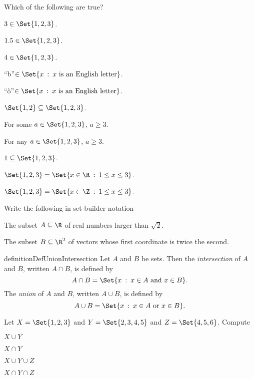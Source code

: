 \begin{question}
	Which of the following are true?
	\begin{parts}
		\item $3\in\Set{1,2,3}$.
		\item $1.5\in\Set{1,2,3}$.
		\item $4\in\Set{1,2,3}$.
		\item ``b''$\in\Set{x\given x\text{ is an English letter}}$.
		\item ``\`o''$\in\Set{x\given x\text{ is an English letter}}$.
		\item $\Set{1,2}\subseteq \Set{1,2,3}$.
		\item For some $a\in\Set{1,2,3}$, $a \geq 3$.
		\item For any $a\in\Set{1,2,3}$, $a\geq 3$.
		\item $1\subseteq\Set{1,2,3}$.
		\item $\Set{1,2,3}=\Set{x\in\R\given 1\leq x\leq 3}$.
		\item $\Set{1,2,3}=\Set{x\in\Z\given 1\leq x\leq 3}$.
	\end{parts}
\end{question}


\begin{question}
	Write the following in set-builder notation
	\begin{parts}
			\item The subset $A\subseteq \R$ of real numbers larger than $\sqrt{2}$.
			\item The subset $B\subseteq \R^2$ of vectors whose first coordinate
			is twice the second.
	\end{parts}
\end{question}

	\begin{restatable*}{definition}{DefUnionIntersection}
		Let $A$ and $B$ be sets. Then the \emph{intersection} of $A$ and $B$, written
		$A\cap B$, is defined by
		\[
			A\cap B=\Set{x\given x\in A\text{ and }x\in B}.
		\]
		The \emph{union} of $A$ and $B$, written $A\cup B$, is defined by
		\[
			A\cup B= \Set{x\given x\in A\text{ or } x\in B}.
		\]
	\end{restatable*}

\begin{question}
	Let $X=\Set{1,2,3}$ and $Y=\Set{2,3,4,5}$ and $Z=\Set{4,5,6}$.  Compute
	\begin{parts}
		\item $X\cup Y$
		\item $X\cap Y$
		\item $X\cup Y\cup Z$
		\item $X\cap Y\cap Z$
	\end{parts}
\end{question}


